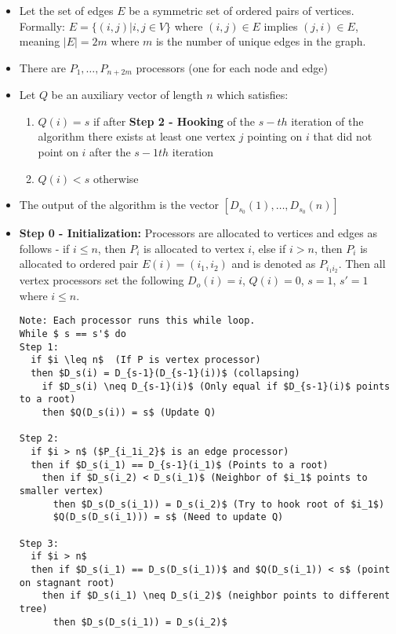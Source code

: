 \documentclass[a4paper]{article}
\begin{document}
\begin{itemize}
\begin{itemize}
\item Let the set of edges $E$ be a symmetric set of ordered pairs of vertices. Formally: $E = \{ (i, j) | i, j \in V \}$ where $(i, j) \in E$ implies $(j, i) \in E$, meaning $|E| = 2m$ where $m$ is the number of unique edges in the graph.

\item There are $P_1, \ldots, P_{n+2m}$ processors (one for each node and edge) 

\item Let $Q$ be an auxiliary vector of length $n$ which satisfies:
\begin{enumerate}
\item $Q(i) = s$ if after \textbf{Step 2 - Hooking}  of the $s-th$ iteration of the algorithm there exists at least one vertex $j$ pointing on $i$ that did not point on $i$ after the $s-1th$ iteration

\item $Q(i) < s$ otherwise
\end{enumerate}

\item The output of the algorithm is the vector $[D_{s_0}(1),\ldots,D_{s_0}(n)]$

\item \textbf{Step 0 - Initialization:} Processors are allocated to vertices and edges as follows - if $i \leq n$, then $P_i$ is allocated to vertex $i$, else if $i > n$, then $P_i$ is allocated to ordered pair $E(i) = (i_1, i_2)$ and is denoted as $P_{i_1i_2}$. Then all vertex processors set the following $D_o(i) = i$, $Q(i) = 0$, $s = 1$, $s' = 1$ where $i \leq n$.

\begin{lstlisting}
Note: Each processor runs this while loop.
While $ s == s'$ do
Step 1: 
  if $i \leq n$	 (If P is vertex processor)
  then $D_s(i) = D_{s-1}(D_{s-1}(i))$ (collapsing)
    if $D_s(i) \neq D_{s-1}(i)$ (Only equal if $D_{s-1}(i)$ points to a root) 
    then $Q(D_s(i)) = s$ (Update Q)
    
Step 2:
  if $i > n$ ($P_{i_1i_2}$ is an edge processor)
  then if $D_s(i_1) == D_{s-1}(i_1)$ (Points to a root)
    then if $D_s(i_2) < D_s(i_1)$ (Neighbor of $i_1$ points to smaller vertex)
      then $D_s(D_s(i_1)) = D_s(i_2)$ (Try to hook root of $i_1$)
      $Q(D_s(D_s(i_1))) = s$ (Need to update Q)
    
Step 3:
  if $i > n$
  then if $D_s(i_1) == D_s(D_s(i_1))$ and $Q(D_s(i_1)) < s$ (point on stagnant root)
    then if $D_s(i_1) \neq D_s(i_2)$ (neighbor points to different tree)
      then $D_s(D_s(i_1)) = D_s(i_2)$
      

\end{lstlisting}
\end{itemize}
\end{itemize}
\end{document}
